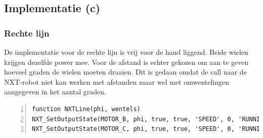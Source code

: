 \documentclass[a4paper]{article}
\begin{document}
\subsection{Implementatie (c)}
\subsubsection{Rechte lijn}
De implementatie voor de rechte lijn is vrij voor de hand liggend. Beide wielen krijgen dezelfde power mee. Voor de afstand is echter gekozen om aan te geven hoeveel graden de wielen moeten draaien. Dit is gedaan omdat de call naar de NXT-robot niet kan werken met afstanden maar wel met omwentelingen aangegeven in het aantal graden.
\begin{lstlisting}[caption=Rechte lijn, label=lst:line, numbers=left]
function NXTLine(phi, wentels)
NXT_SetOutputState(MOTOR_B, phi, true, true, 'SPEED', 0, 'RUNNING', wentels, 'dontreply');
NXT_SetOutputState(MOTOR_C, phi, true, true, 'SPEED', 0, 'RUNNING', wentels, 'dontreply');
\end{lstlisting}
\end{document}
